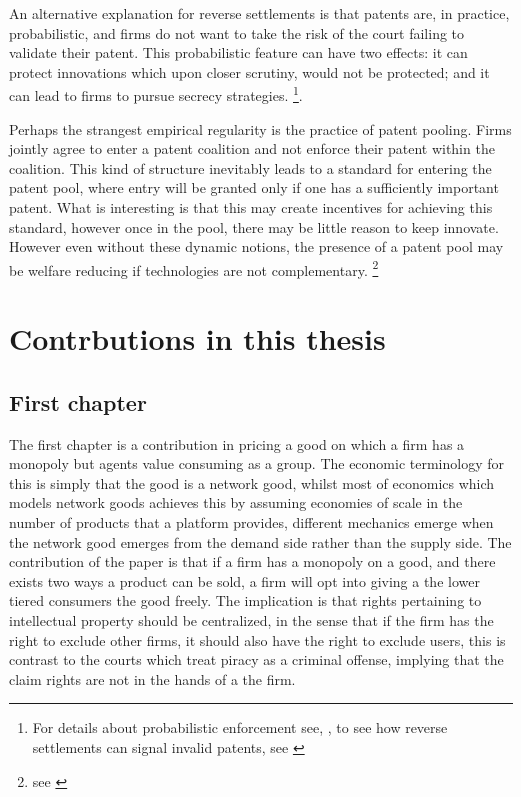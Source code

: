 \documentclass[12pt]{report}
\numberwithin{equation}{section}
\begin{document}
An alternative explanation for reverse settlements is that patents are, in practice, probabilistic, and firms do not want to take the risk of the court failing to validate their patent. This probabilistic feature can have two effects: it can protect innovations which upon closer scrutiny, would not be protected; and it can lead to firms to pursue secrecy strategies. \footnote{For details about probabilistic enforcement see, \cite{Lemley2005}, to see how reverse settlements can signal invalid patents, see \cite{Dolin2011}}.

Perhaps the strangest empirical regularity is the practice of patent pooling. Firms jointly agree to enter a patent coalition and not enforce their patent within the coalition. This kind of structure inevitably leads to a standard for entering the patent pool, where entry will be granted only if one has a sufficiently important patent. What is interesting is that this may create incentives for achieving this standard, however once in the pool, there may be little reason to keep innovate. However even without these dynamic notions, the presence of a patent pool may be welfare reducing if technologies are not complementary. \footnote{see \cite{Lerner2004}}

\section{Contrbutions in this thesis}

\subsection{First chapter}

The first chapter is a contribution in pricing a good on which a firm has a monopoly but agents value consuming as a group. The economic terminology for this is simply that the good is a network good, whilst most of economics which models network goods achieves this by assuming economies of scale in the number of products that a platform provides, different mechanics emerge when the network good emerges from the demand side rather than the supply side. The contribution of the paper is that if a firm has a monopoly on a good, and there exists two ways a product can be sold, a firm will opt into giving a the lower tiered consumers the good freely. The implication is that rights pertaining to intellectual property should be centralized, in the sense that if the firm has the right to exclude other firms, it should also have the right to exclude users, this is contrast to the courts which treat piracy as a criminal offense, implying that the claim rights are not in the hands of a the firm.
\end{document}
